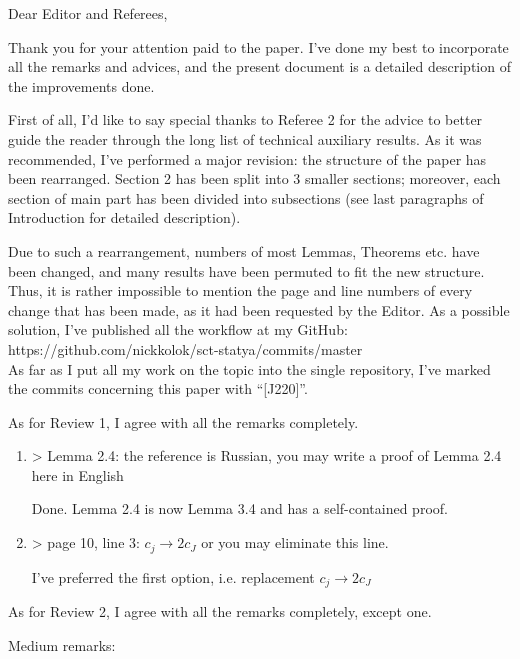 \documentclass[a4paper,14pt]{article} %
\begin{document}
Dear Editor and Referees,

Thank you for your attention paid to the paper.
I've done my best to incorporate all the remarks and advices,
and the present document is a detailed description of the improvements done.

First of all, I'd like to say special thanks to Referee 2 for the advice
to better guide the reader through the long list of technical auxiliary results.
As it was recommended, I've performed a major revision:
the structure of the paper has been rearranged.
Section 2 has been split into 3 smaller sections;
moreover, each section of main part has been divided into subsections
(see last paragraphs of Introduction for detailed description).

Due to such a rearrangement, numbers of most Lemmas, Theorems etc. have been changed,
and many results have been permuted to fit the new structure.
Thus, it is rather impossible to mention the page and line numbers of every change that has been made,
as it had been requested by the Editor.
As a possible solution, I've published all the workflow at my GitHub:
\\
https://github.com/nickkolok/sct-statya/commits/master
\\
As far as I put all my work on the topic into the single repository,
I've marked the commits concerning this paper with ``[J220]''.

As for Review 1, I agree with all the remarks completely.
\begin{enumerate}
	\item
		> Lemma 2.4: the reference is Russian, you may write a proof of Lemma 2.4 here in English

		Done. Lemma 2.4 is now Lemma 3.4 and has a self-contained proof.

	\item

		> page 10, line 3: $c_j \rightarrow 2c_J$ or you may eliminate this line.

		I've preferred the first option, i.e. replacement $c_j \rightarrow 2c_J$
\end{enumerate}

As for Review 2, I agree with all the remarks completely, except one.

Medium remarks:
\end{document}
